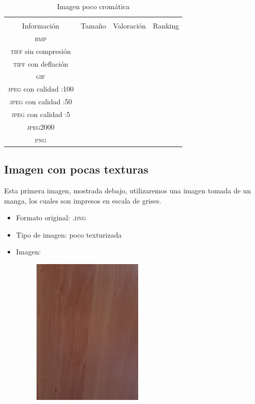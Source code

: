 \documentclass[11pt,a4paper]{article}
\begin{document}
\begin{table}[H]
\centering
\begin{tabular}{|c|c|c|c|}
\hline
\diagbox[width=15em]{\textit{Códec}/Formato}{\\Información} & Tamaño & Valoración & Ranking \\
\hline
\textsc{bmp} &  &  &  \\ \hline
\textsc{tiff} sin compresión &  &  &  \\ \hline
\textsc{tiff} con deflación &  &  &  \\ \hline
\textsc{gif} &  &  &  \\ \hline
\textsc{jpeg} con calidad :100 &  &  &  \\ \hline
\textsc{jpeg} con calidad :50 &  &  &  \\ \hline
\textsc{jpeg} con calidad :5 &  &  &  \\ \hline
\textsc{jpeg2000} &  &  &  \\ \hline
\textsc{png} &  &  &  \\ \hline
\end{tabular}
\caption{Imagen poco cromática}
\label{tab:my-table}
\end{table}


\subsection{Imagen con pocas texturas}

Esta primera imagen, mostrada debajo, utilizaremos una imagen tomada de un manga, los cuales son impresos en escala de grises.

\begin{itemize}
	\item Formato original: \textsc{.dng}
	\item Tipo de imagen: poco texturizada
	\item Imagen:
		\begin{figure}[H]
		\centering
			\includegraphics[width=0.5\textwidth]{Fotos/pocas_texturas.jpg}
		\end{figure}	
\end{itemize}
\end{document}
